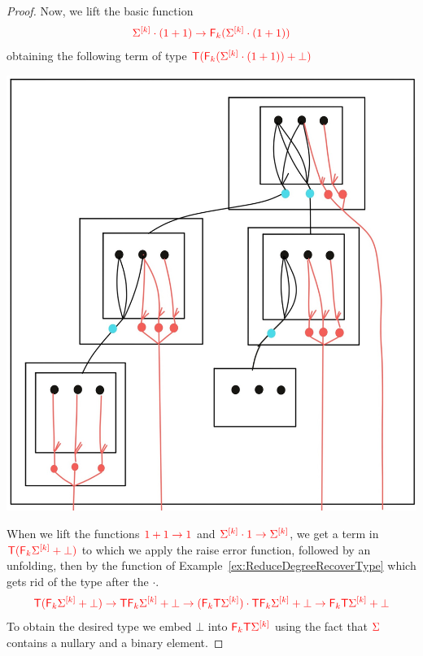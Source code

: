 \begin{proof}
Now, we lift the basic function
\begin{align*}
{\color{red}{\Sigma^{{\color{red}{[k]}}}\cdot(1+1)\to {\color{red}{\mathsf F_{k}}}(\Sigma^{{\color{red}{[k]}}}\cdot(1+1))}}
\end{align*}
obtaining the following term of type ${\color{red}{{\color{red}{\mathsf T}}({\color{red}{\mathsf F_{k}}}(\Sigma^{{\color{red}{[k]}}}\cdot(1+1))+\bot)}}$
\begin{center}
\includegraphics[scale=.1]{MyPic26.jpg}
\end{center}  
When we lift the functions ${\color{red}{1+1\to 1}}$ and ${\color{red}{\Sigma^{{\color{red}{[k]}}}\cdot 1\to \Sigma^{{\color{red}{[k]}}}}}$, we get a term in ${\color{red}{{\color{red}{\mathsf T}}({\color{red}{\mathsf F_{k}}}\Sigma^{{\color{red}{[k]}}}+\bot)}}$ to which we apply the raise error function, followed by an unfolding, then by the function of Example~\ref{ex:ReduceDegreeRecoverType} which gets rid of the type after the $\cdot$.
\begin{align*}
{\color{red}{{\color{red}{\mathsf T}}({\color{red}{\mathsf F_{k}}}\Sigma^{{\color{red}{[k]}}}+\bot)\to {\color{red}{\mathsf T}}{\color{red}{\mathsf F_{k}}}\Sigma^{{\color{red}{[k]}}}+\bot\to ({\color{red}{\mathsf F_{k}}}{\color{red}{\mathsf T}}\Sigma^{{\color{red}{[k]}}})\cdot{\color{red}{\mathsf T}}{\color{red}{\mathsf F_{k}}}\Sigma^{{\color{red}{[k]}}} +\bot\to {\color{red}{\mathsf F_{k}}}{\color{red}{\mathsf T}}\Sigma^{{\color{red}{[k]}}}+\bot }}
\end{align*}
To obtain the desired type  we embed $\bot$ into ${\color{red}{{\color{red}{\mathsf F_{k}}}{\color{red}{\mathsf T}}\Sigma^{{\color{red}{[k]}}}}}$ using the fact that ${\color{red}{\Sigma}}$ contains a nullary and a binary element. 
\end{proof}
